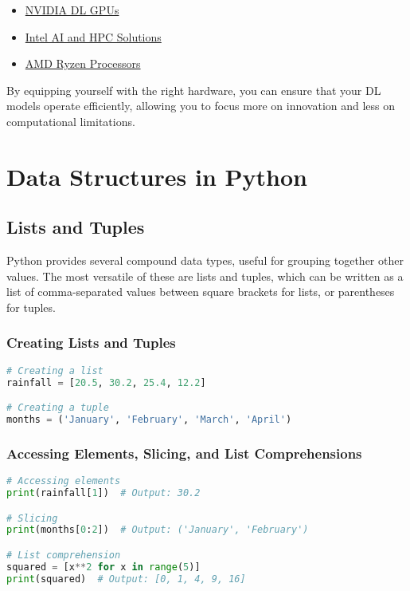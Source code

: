 \begin{itemize}
    \item \href{https://www.nvidia.com/en-us/deep-learning-ai/products/}{NVIDIA DL GPUs}
    \item \href{https://www.intel.com/content/www/us/en/high-performance-computing/hpc-overview.html}{Intel AI and HPC Solutions}
    \item \href{https://www.amd.com/en/processors/ryzen-for-business}{AMD Ryzen Processors}
\end{itemize}

By equipping yourself with the right hardware, you can ensure that your DL models operate efficiently, allowing you to focus more on innovation and less on computational limitations.

\section{Data Structures in Python}

\subsection{Lists and Tuples}
Python provides several compound data types, useful for grouping together other values. The most versatile of these are lists and tuples, which can be written as a list of comma-separated values between square brackets for lists, or parentheses for tuples.

\subsubsection{Creating Lists and Tuples}
\begin{lstlisting}[language=Python]
# Creating a list
rainfall = [20.5, 30.2, 25.4, 12.2]

# Creating a tuple
months = ('January', 'February', 'March', 'April')
\end{lstlisting}

\subsubsection{Accessing Elements, Slicing, and List Comprehensions}
\begin{lstlisting}[language=Python]
# Accessing elements
print(rainfall[1])  # Output: 30.2

# Slicing
print(months[0:2])  # Output: ('January', 'February')

# List comprehension
squared = [x**2 for x in range(5)]
print(squared)  # Output: [0, 1, 4, 9, 16]
\end{lstlisting}

